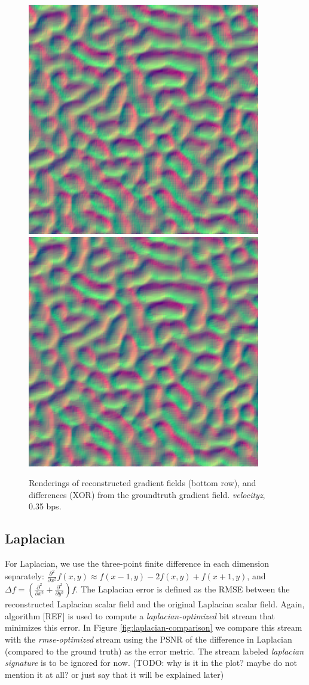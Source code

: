 \begin{figure}
	{\includegraphics[width=0.24\linewidth]{img/gradient/gradient_2.png}}
	{\includegraphics[width=0.24\linewidth]{img/gradient/gradient_3.png}}
	\caption{Renderings of reconstructed gradient fields (bottom row), and differences (XOR) from the groundtruth gradient field. \emph{velocityz}, 0.35 bps.}
  \label{fig:gradient-rendering}
\end{figure}

\subsection{Laplacian}

For Laplacian, we use the three-point finite difference in each dimension separately:
$\frac{{\partial}^2}{\partial{x^2}}f(x,y) \approx f(x-1,y)-2f(x,y)+f(x+1,y)$, and $\Delta
f=(\frac{{\partial}^2}{\partial{x^2}}+\frac{{\partial}^2}{\partial{y^2}})f$. The Laplacian error is
defined as the RMSE between the reconstructed Laplacian scalar field and the original Laplacian
scalar field. Again, algorithm [REF] is used to compute a \emph{laplacian-optimized} bit stream that
minimizes this error. In Figure \ref{fig:laplacian-comparison} we compare this stream with the
\emph{rmse-optimized} stream using the PSNR of the difference in Laplacian (compared to the
ground truth) as the error metric. The stream labeled \emph{laplacian signature} is to be ignored for
now. (TODO: why is it in the plot? maybe do not mention it at all? or just say that it will be explained later)

